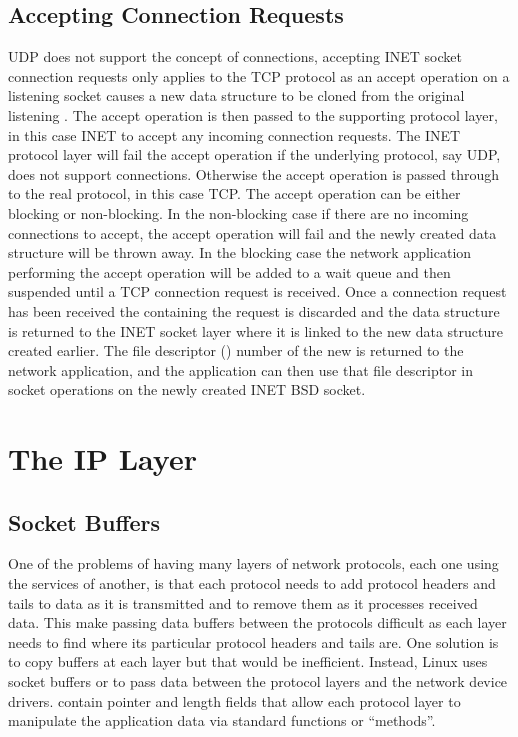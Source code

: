 \subsection{Accepting Connection Requests}
UDP does not support the concept of connections,
accepting INET socket connection requests only applies to the TCP protocol as 
an accept operation on a listening socket causes a new  data structure to
be cloned from the original listening .
The accept operation is then passed to the supporting protocol layer, in this case
INET to accept any incoming connection requests.
The INET protocol layer will fail the accept operation if the underlying protocol, say
UDP, does not support connections.
Otherwise the accept operation is passed through to the real protocol, in this case TCP.
The accept operation can be either blocking or non-blocking.
In the non-blocking case if there are no incoming connections to accept, the accept operation
will fail and the newly created  data structure will be thrown away.
In the blocking case the network application performing the accept operation will be added to
a wait queue and then suspended until a TCP connection request is received.
Once a connection request has been received the  containing the request is
discarded and the  data structure is returned to the INET socket layer where
it is linked to the new  data structure created earlier.
The file descriptor () number of the new  is returned to the network application,
and the application can then use that file descriptor in socket operations on the newly created
INET BSD socket.

\section{The IP Layer}
\subsection{Socket Buffers}
One of the problems of having many layers of network protocols, each one using the services of
another,	is that each protocol needs to
add protocol headers and tails to data as it is transmitted and to remove them as 
it processes received data.
This make passing data buffers between the protocols difficult as each layer needs to find where its
particular protocol headers and tails are.
One solution is to copy buffers at each layer but that would be inefficient.
Instead, Linux uses socket buffers or  to pass data between the protocol layers and
the network device drivers.
 contain pointer and length fields that allow each protocol layer to manipulate
the application data via standard functions or ``methods''.

